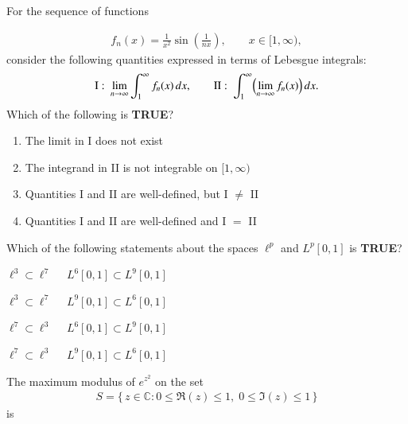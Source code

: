 \documentclass[journal,12pt,onecolumn]{IEEEtran}
\theoremstyle{remark}
\begin{document}
\begin{enumerate}
{
\newpage
\item For the sequence of functions

\begin{align*}
f_n(x)=\frac{1}{x^{2}}\sin\!\left(\frac{1}{n x}\right),\qquad x\in[1,\infty),
\end{align*}
consider the following quantities expressed in terms of Lebesgue integrals:
\begin{align*}
\text{I}:\ \lim_{n\to\infty}\int_{1}^{\infty} f_n(x)\,dx,
\qquad
\text{II}:\ \int_{1}^{\infty}\Bigl(\lim_{n\to\infty} f_n(x)\Bigr)\,dx.
\end{align*}
Which of the following is \textbf{TRUE}?


\begin{enumerate}
\item The limit in I does not exist
\item The integrand in II is not integrable on $[1,\infty)$
\item Quantities I and II are well-defined, but I $\ne$ II
\item Quantities I and II are well-defined and I $=$ II
\end{enumerate}


\item  Which of the following statements about the spaces $\ell^{p}$ and $L^{p}[0,1]$ is \textbf{TRUE}?

\hfill{}

\begin{enumerate}
\begin{multicols}{2}
\item $\ell^{3}\subset \ell^{7}$ \ \  $L^{6}[0,1]\subset L^{9}[0,1]$
\item $\ell^{3}\subset \ell^{7}$ \ \  $L^{9}[0,1]\subset L^{6}[0,1]$
\item $\ell^{7}\subset \ell^{3}$ \ \  $L^{6}[0,1]\subset L^{9}[0,1]$
\item $\ell^{7}\subset \ell^{3}$ \ \  $L^{9}[0,1]\subset L^{6}[0,1]$
\end{multicols}
\end{enumerate}


\item The maximum modulus of $e^{z^{2}}$ on the set
\begin{align*}
S=\{\, z\in\mathbb{C} : 0\le \Re(z)\le 1,\; 0\le \Im(z)\le 1 \,\}
\end{align*}
is
\hfill{}

}
\end{enumerate}
\end{document}
